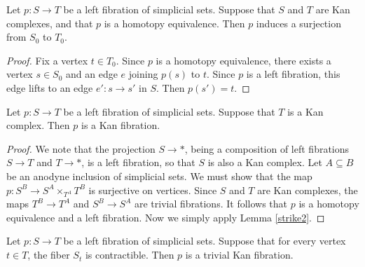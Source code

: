 \begin{lemma}\label{strike2}
Let $p: S \rightarrow T$ be a left fibration of simplicial sets. Suppose that $S$ and $T$ are Kan complexes, and that $p$ is a homotopy equivalence. Then $p$ induces a surjection from $S_0$ to $T_0$.
\end{lemma}

\begin{proof}
Fix a vertex $t \in T_0$. Since $p$ is a homotopy equivalence, there exists a vertex $s \in S_0$ and an edge $e$ joining $p(s)$ to $t$. Since $p$ is a left fibration, this edge lifts to an edge $e': s \rightarrow s'$ in $S$. Then $p(s')=t$.
\end{proof}

\begin{lemma}\label{toothie2}
Let $p: S \rightarrow T$ be a left fibration of simplicial sets. Suppose that $T$ is a Kan complex. Then $p$ is a Kan fibration.
\end{lemma}

\begin{proof} 
We note that the projection $S \rightarrow \ast$, being a composition of left fibrations
$S \rightarrow T$ and $T \rightarrow \ast$, is a left fibration, so that $S$ is also a Kan complex.
Let $A \subseteq B$ be an anodyne inclusion of simplicial sets. We must show that the map
$p: S^B \rightarrow S^A \times_{ T^A} T^B$ is surjective on vertices. Since $S$ and $T$ are Kan complexes, the maps $T^B \rightarrow T^A$ and $S^B \rightarrow S^A$ are trivial fibrations. It follows that $p$ is a homotopy equivalence and a left fibration. Now we simply apply Lemma \ref{strike2}.
\end{proof}

\begin{lemma}\label{toothie}
Let $p: S \rightarrow T$ be a left fibration of simplicial sets. Suppose that for every vertex $t \in T$, the fiber $S_{t}$ is contractible. Then $p$ is a trivial Kan fibration.
\end{lemma}

